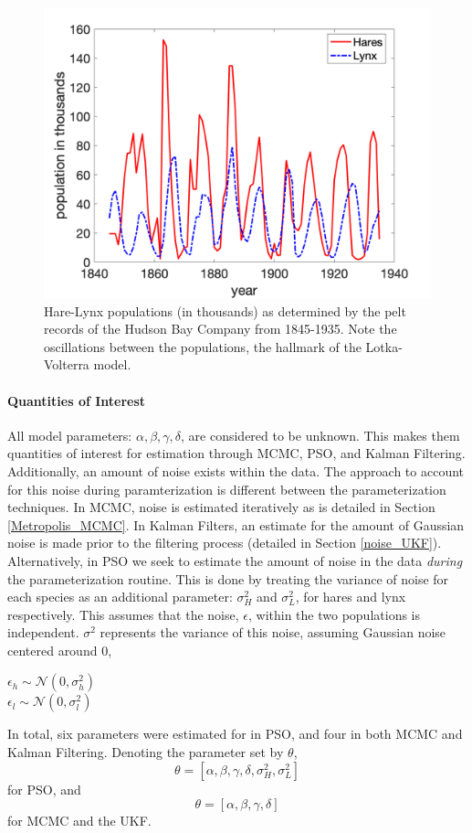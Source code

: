 \begin{figure}[H]
    \centering
    \includegraphics[width=15cm]{Model_Setup_Images/HaresLynxData.png}
    \caption{Hare-Lynx populations (in thousands) as determined by the pelt records of the Hudson Bay Company from 1845-1935. Note the oscillations between the populations, the hallmark of the Lotka-Volterra model.}
    \label{fig:0prob}
\end{figure}

\paragraph{Quantities of Interest} \label{section:LV_params}
All model parameters: $\alpha, \beta, \gamma, \delta$, are considered to be unknown. This makes them quantities of interest for estimation through MCMC, PSO, and Kalman Filtering. Additionally, an amount of noise exists within the data. The approach to account for this noise during paramterization is different between the parameterization techniques. In MCMC, noise is estimated iteratively as is detailed in Section \ref{Metropolis_MCMC}. In Kalman Filters, an estimate for the amount of Gaussian noise is made prior to the filtering process (detailed in Section \ref{noise_UKF}). Alternatively, in PSO we seek to estimate the amount of noise in the data \emph{during} the parameterization routine. This is done by treating the variance of noise for each species as an additional parameter: $\sigma^{2}_{H}$ and $\sigma^{2}_{L}$, for hares and lynx respectively. This assumes that the noise, $\epsilon$, within the two populations is independent. $\sigma^{2}$ represents the variance of this noise, assuming Gaussian noise centered around 0,
\begin{center}
$\epsilon_{h}\sim\mathcal{N}(0,\sigma_{h}^{2})$\\
$\epsilon_{l}\sim\mathcal{N}(0,\sigma_{l}^{2})$
\end{center}
In total, six parameters were estimated for in PSO, and four in both MCMC and Kalman Filtering. Denoting the parameter set by $\theta$,
$$\theta = [\alpha, \beta, \gamma, \delta, \sigma_{H}^{2}, \sigma_{L}^{2}]$$ for PSO, and $$\theta = [\alpha, \beta, \gamma, \delta]$$ for MCMC and the UKF.

